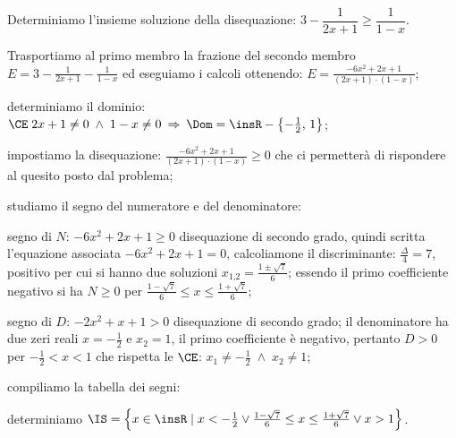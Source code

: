 \begin{exrig}
\begin{esempio}
Determiniamo l'insieme soluzione della disequazione: $3-\dfrac 1{2x+1}\ge \dfrac 1{1-x}$.
\begin{enumeratea}
\item Trasportiamo al primo membro la frazione del secondo membro $E=3-\frac 1{2x+1}-\frac 1{1-x}$ ed eseguiamo i calcoli ottenendo: $E=\frac{-6x^2+2x+1}{(2x+1)\cdot (1-x)}$;
\item determiniamo il dominio: $\CE\; 2x+1\neq 0\;\wedge\; 1-x\neq 0 \:\Rightarrow\: \Dom=\insR-\left\{-\frac 1 2\text{, }1\right\}$;
\item impostiamo la disequazione: $\frac{-6x^2+2x+1}{(2x+1)\cdot (1-x)}\ge 0$ che ci permetterà di rispondere al quesito posto dal problema;
\item studiamo il segno del numeratore e del denominatore:
\begin{itemize*}
\item segno di $N$: $-6x^2+2x+1\ge 0$ disequazione di secondo grado, quindi scritta l'equazione associata $-6x^2+2x+1=0$, calcoliamone il discriminante: $\frac{\Delta } 4=7$, positivo per cui si hanno due soluzioni $x_{1\text{,}2}=\frac{1\pm \sqrt 7} 6$; essendo il primo coefficiente negativo si ha $N\ge 0$ per $\frac{1-\sqrt 7} 6\le x\le \frac{1+\sqrt 7} 6$;
\item segno di $D$: $-2x^2+x+1>0$ disequazione di secondo grado; il denominatore ha due zeri reali $x=-\frac 1 2$ e $x_2=1$, il primo coefficiente è negativo, pertanto $D>0$ per $-\frac 1 2<x<1$ che rispetta le $\CE$: $x_1\neq -\frac 1 2\;\wedge\; x_2\neq 1$;
\end{itemize*}
\item compiliamo la tabella dei segni:
\begin{center}
 
\end{center}
\item determiniamo $\IS=\left\{x\in \insR \mid x<-\frac 1 2\vee \frac{1-\sqrt 7} 6\le x\le \frac{1+\sqrt 7} 6\vee x>1\right\}$.
\end{enumeratea}
\end{esempio}
\end{exrig}

\vspazio\ovalbox{\risolvii \ref{ese:4.58}, \ref{ese:4.59}, \ref{ese:4.60}, \ref{ese:4.61}, \ref{ese:4.62}, \ref{ese:4.63}, \ref{ese:4.64}, \ref{ese:4.65}, \ref{ese:4.66}, \ref{ese:4.67}, \ref{ese:4.68}, \ref{ese:4.69}, \ref {ese:4.70},}

\vspazio\ovalbox{\ref{ese:4.71}, \ref{ese:4.72}, \ref{ese:4.47}, \ref{ese:4.73}, \ref{ese:4.74}}

